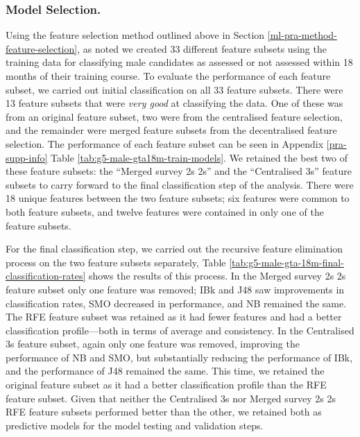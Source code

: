 \documentclass[
  12pt,
  a4paper,
]{book}
\begin{document}
\hypertarget{model-selection.-1}{%
\subsubsection{Model Selection.}\label{model-selection.-1}}

Using the feature selection method outlined above in Section \ref{ml-pra-method-feature-selection}, as noted we created 33 different feature subsets using the training data for classifying male candidates as assessed or not assessed within 18 months of their training course. To evaluate the performance of each feature subset, we carried out initial classification on all 33 feature subsets. There were 13 feature subsets that were \emph{very good} at classifying the data. One of these was from an original feature subset, two were from the centralised feature selection, and the remainder were merged feature subsets from the decentralised feature selection. The performance of each feature subset can be seen in Appendix \ref{pra-supp-info} Table \ref{tab:g5-male-gta18m-train-models}. We retained the best two of these feature subsets: the ``Merged survey 2s 2s'' and the ``Centralised 3s'' feature subsets to carry forward to the final classification step of the analysis. There were 18 unique features between the two feature subsets; six features were common to both feature subsets, and twelve features were contained in only one of the feature subsets.

For the final classification step, we carried out the recursive feature elimination process on the two feature subsets separately, Table \ref{tab:g5-male-gta-18m-final-classification-rates} shows the results of this process. In the Merged survey 2s 2s feature subset only one feature was removed; IBk and J48 saw improvements in classification rates, SMO decreased in performance, and NB remained the same. The RFE feature subset was retained as it had fewer features and had a better classification profile---both in terms of average and consistency. In the Centralised 3s feature subset, again only one feature was removed, improving the performance of NB and SMO, but substantially reducing the performance of IBk, and the performance of J48 remained the same. This time, we retained the original feature subset as it had a better classification profile than the RFE feature subset. Given that neither the Centralised 3s nor Merged survey 2s 2s RFE feature subsets performed better than the other, we retained both as predictive models for the model testing and validation steps.
\end{document}
